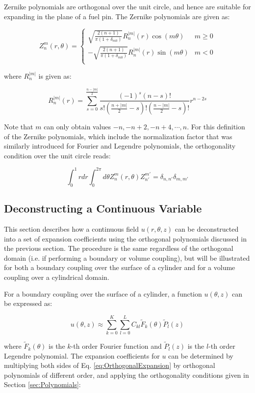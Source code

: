 \documentclass[10pt]{article}
\newcommand{\beq}{\begin{equation}}
\newcommand{\eeq}{\end{equation}}
\numberwithin{equation}{section} %
\begin{document}
Zernike polynomials are orthogonal over the unit circle, and hence are suitable for expanding in the plane of a fuel pin. The Zernike polynomials are given as:

\beq
\label{eq:ZernikeScaled}
Z_n^m(r,\theta)=
\begin{cases}
\sqrt{\frac{2(n+1)}{\pi\left(1+\delta_{m0}\right)}}R_n^{|m|}(r)\cos{(m\theta)} & m\geq 0\\
-\sqrt{\frac{2(n+1)}{\pi\left(1+\delta_{m0}\right)}}R_n^{|m|}(r)\sin{(m\theta)} & m < 0\\
\end{cases}
\eeq

where \(R_n^{|m|}\) is given as:

\beq
R_n^{|m|}(r)=\sum_{s=0}^{\frac{n-|m|}{2}}\frac{(-1)^s(n-s)!}{s!\left(\frac{n+|m|}{2}-s\right)!\left(\frac{n-|m|}{2}-s\right)!}r^{n-2s}
\eeq

Note that \(m\) can only obtain values \(-n, -n+2, -n+4, \cdots, n\). For this definition of the Zernike polynomials, which include the normalization factor that was similarly introduced for Fourier and Legendre polynomials, the orthogonality condition over the unit circle reads:

\beq
\label{eq:ZernikeOrthogonal}
\int_{0}^{1}rdr\int_{0}^{2\pi}d\theta Z_{n}^m(r,\theta)Z_{n'}^{m'}=\delta_{n,n'}\delta_{m,m'}
\eeq

\subsection{Deconstructing a Continuous Variable}
This section describes how a continuous field \(u(r,\theta,z)\) can be deconstructed into a set of expansion coefficients using the orthogonal polynomials discussed in the previous section. The procedure is the same regardless of the orthogonal domain (i.e. if performing a boundary or volume coupling), but will be illustrated for both a boundary coupling over the surface of a cylinder and for a volume coupling over a cylindrical domain. 

For a boundary coupling over the surface of a cylinder, a function \(u(\theta,z)\) can be expressed as:

\beq
\label{eq:OrthogonalExpansion}
u(\theta, z)\approx\sum_{k=0}^K\sum_{l=0}^LC_{kl}\tilde{F}_k(\theta)\tilde{P}_l(z)
\eeq

where \(\tilde{F}_k(\theta)\) is the \(k\)-th order Fourier function and \(\tilde{P}_l(z)\) is the \(l\)-th order Legendre polynomial. The expansion coefficients for \(u\) can be determined by multiplying both sides of Eq. \eqref{eq:OrthogonalExpansion} by orthogonal polynomials of different order, and applying the orthogonality conditions given in Section \ref{sec:Polynomials}:
\end{document}
